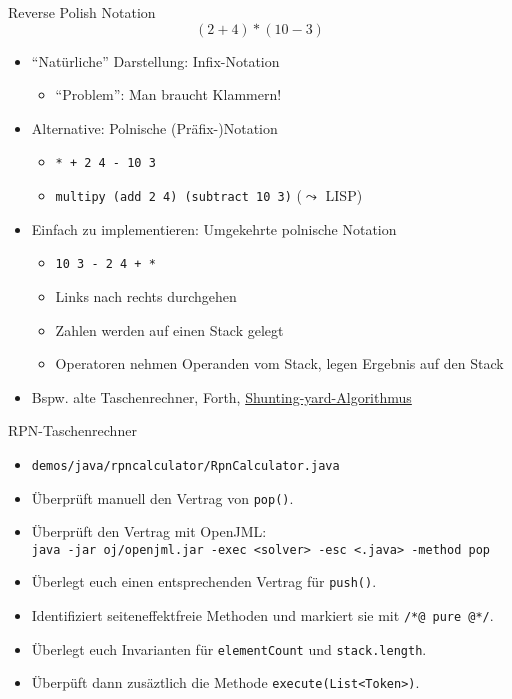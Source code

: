 \documentclass{beamer}
\begin{document}
\begin{frame}{Reverse Polish Notation}
	\begin{equation*}
		(2 + 4) * (10 - 3)
	\end{equation*}

	\begin{itemize}
		\item \enquote{Natürliche} Darstellung: Infix-Notation
		\begin{itemize}
			\item \enquote{Problem}: Man braucht Klammern!
		\end{itemize}
		\pause
		\item Alternative: Polnische (Präfix-)Notation
		\begin{itemize}
			\item \texttt{* + 2 4 - 10 3}
			\item \texttt{multipy (add 2 4) (subtract 10 3)} ($\leadsto$ LISP)
		\end{itemize}
		\pause
		\item Einfach zu implementieren: Umgekehrte polnische Notation
		\begin{itemize}
			\item \texttt{10 3 - 2 4 + *}
			\item Links nach rechts durchgehen
			\item Zahlen werden auf einen Stack gelegt
			\item Operatoren nehmen Operanden vom Stack, legen Ergebnis auf den Stack
		\end{itemize}
		\pause
		\item Bspw. alte Taschenrechner, Forth, \href{https://de.wikipedia.org/wiki/Shunting-yard-Algorithmus}{Shunting-yard-Algorithmus}
	\end{itemize}
\end{frame}

\begin{frame}{RPN-Taschenrechner}
	\begin{itemize}
		\item \texttt{demos/java/rpncalculator/RpnCalculator.java}
		\item Überprüft manuell den Vertrag von \texttt{pop()}.
		\pause
		\item Überprüft den Vertrag mit OpenJML:\\
			{\footnotesize \texttt{java -jar oj/openjml.jar -exec <solver> -esc <.java> -method pop}}
		\pause
		\item Überlegt euch einen entsprechenden Vertrag für \texttt{push()}.
		\pause
		\item Identifiziert seiteneffektfreie Methoden und markiert sie mit \texttt{/*@ pure @*/}.
		\pause
		\item Überlegt euch Invarianten für \texttt{elementCount} und \texttt{stack.length}.
		\item Überpüft dann zusäztlich die Methode \texttt{execute(List<Token>)}.
	\end{itemize}
\end{frame}
\end{document}
